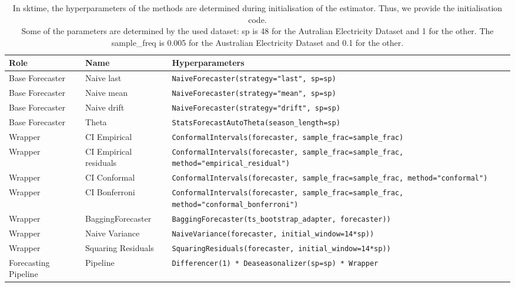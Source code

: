 \documentclass{article}
\begin{document}
\begin{table}[]
    \centering    \caption{
    In sktime, the hyperparameters of the methods are determined during initialisation of the estimator. Thus, we provide the initialisation code. \\
    Some of the parameters are determined by the used dataset: sp is 48 for the Autralian Electricity Dataset and 1 for the other. The sample\_freq is 0.005 for the Australian Electricity Dataset and 0.1 for the other.\\}
    \label{tab:hyperparams}
    \footnotesize
    \begin{tabular}{p{2.5cm}p{4cm}|p{7.5cm}}
    \toprule  
         Role & Name &  Hyperparameters \\ \midrule
         Base Forecaster & Naive last &  \texttt{NaiveForecaster(strategy="last", sp=sp)}\\
         Base Forecaster &  Naive mean &  \texttt{NaiveForecaster(strategy="mean", sp=sp)}\\
         Base Forecaster & Naive drift &  \texttt{NaiveForecaster(strategy="drift", sp=sp)}\\ 
         Base Forecaster & Theta &   \texttt{StatsForecastAutoTheta(season\_length=sp)} \\ \midrule
         Wrapper & CI Empirical & \texttt{ConformalIntervals(forecaster, sample\_frac=sample\_frac)} \\
         Wrapper & CI Empirical residuals & \texttt{ConformalIntervals(forecaster, sample\_frac=sample\_frac, method="empirical\_residual")} \\
         Wrapper & CI Conformal & \texttt{ConformalIntervals(forecaster, sample\_frac=sample\_frac, method="conformal")} \\
         Wrapper & CI Bonferroni & \texttt{ConformalIntervals(forecaster, sample\_frac=sample\_frac, method="conformal\_bonferroni")} \\
         Wrapper & BaggingForecaster & \texttt{BaggingForecaster(ts\_bootstrap\_adapter, forecaster))} \\
         Wrapper & Naive Variance & \texttt{NaiveVariance(forecaster, initial\_window=14*sp))}\\
         Wrapper & Squaring Residuals & \texttt{SquaringResiduals(forecaster, initial\_window=14*sp))}  \\ \midrule
         Forecasting Pipeline & Pipeline & \texttt{Differencer(1) * Deaseasonalizer(sp=sp) * Wrapper} \\ \midrule
        

\end{tabular}
\end{table}
\end{document}
